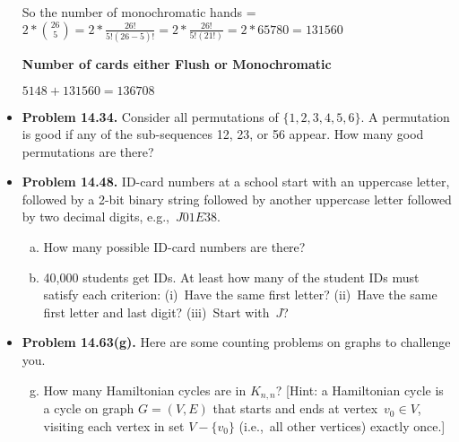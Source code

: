 \documentclass[11pt]{article}
\begin{document}
\begin{itemize}
So the number of monochromatic hands = $2 * \binom{26}{5} = 2 * \frac{26!}{5!(26-5)!} = 2 * \frac{26!}{5!(21!)} = 2 * 65780 = \boxed{131560}$

\textbf{Number of cards either Flush or Monochromatic}

$5148 + 131560 = \boxed{136708}$

\vspace{0.2in}

\item \textbf{Problem 14.34.}
Consider all permutations of $\{1,2,3,4,5,6\}$.
A permutation is good if any of the sub-sequences 12, 23, or 56 appear.
How many good permutations are there?

\vspace{0.2in}

\item \textbf{Problem 14.48.}
ID-card numbers at a school start with an uppercase letter,
followed by a 2-bit binary string followed by another uppercase letter
followed by two decimal digits, e.g.,~$J01E38$.
\begin{enumerate}[(a)]
\item How many possible ID-card numbers are there?
\item 40,000 students get IDs.
  At least how many of the student IDs must satisfy each criterion:
  (i)~Have the same first letter?
  (ii)~Have the same first letter and last digit?
  (iii)~Start with~$J$?
\end{enumerate}

\vspace{0.2in}

\item \textbf{Problem 14.63(g).}
Here are some counting problems on graphs to challenge you.
\begin{enumerate}[(a)]
\setcounter{enumi}{6}
\item How many Hamiltonian cycles are in $K_{n,n}$?
  [Hint: a Hamiltonian cycle is a cycle on graph $G=(V,E)$ that
  starts and ends at vertex~$v_0\in V$,
  visiting each vertex in set $V-\{v_0\}$ (i.e.,~all other vertices)
  exactly once.]
\end{enumerate}

\vspace{0.2in}


\end{itemize}
\end{document}
